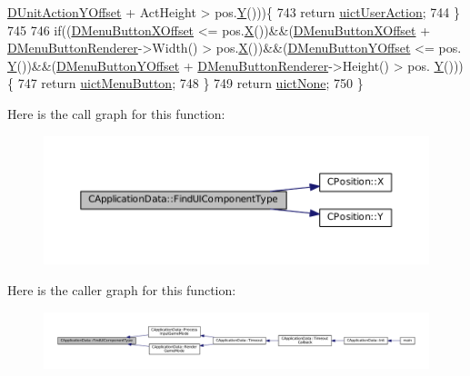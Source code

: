 \begin{DoxyCode}
      \hyperlink{classCApplicationData_a8ccfb55bd25cba0e6eb66573ba9c8b3c}{DUnitActionYOffset} + ActHeight > pos.\hyperlink{classCPosition_a1aa8a30e2f08dda1f797736ba8c13a87}{Y}()))\{
743         \textcolor{keywordflow}{return} \hyperlink{classCApplicationData_ad49585591fc53bff1c89bc512170280da9b2752db122b319f942c3b69c2accfab}{uictUserAction};
744     \}
745     
746     \textcolor{keywordflow}{if}((\hyperlink{classCApplicationData_a04283b17a8c04af8325de4304a848095}{DMenuButtonXOffset} <= pos.\hyperlink{classCPosition_a9a6b94d3b91df1492d166d9964c865fc}{X}())&&(\hyperlink{classCApplicationData_a04283b17a8c04af8325de4304a848095}{DMenuButtonXOffset} + 
      \hyperlink{classCApplicationData_a2c9f10aa452454a016e0164f6ce777a6}{DMenuButtonRenderer}->Width() > pos.\hyperlink{classCPosition_a9a6b94d3b91df1492d166d9964c865fc}{X}())&&(\hyperlink{classCApplicationData_a63012360d0a98eef89707a503f4379a8}{DMenuButtonYOffset} <= pos.
      \hyperlink{classCPosition_a1aa8a30e2f08dda1f797736ba8c13a87}{Y}())&&(\hyperlink{classCApplicationData_a63012360d0a98eef89707a503f4379a8}{DMenuButtonYOffset} + \hyperlink{classCApplicationData_a2c9f10aa452454a016e0164f6ce777a6}{DMenuButtonRenderer}->Height() > pos.
      \hyperlink{classCPosition_a1aa8a30e2f08dda1f797736ba8c13a87}{Y}()))\{
747         \textcolor{keywordflow}{return} \hyperlink{classCApplicationData_ad49585591fc53bff1c89bc512170280da8323c73a1745d4b4e6e469088041f264}{uictMenuButton};
748     \}
749     \textcolor{keywordflow}{return} \hyperlink{classCApplicationData_ad49585591fc53bff1c89bc512170280da21bc83c610f1f8b1d686aed22d343f93}{uictNone};
750 \}
\end{DoxyCode}
Here is the call graph for this function\+:\nopagebreak
\begin{figure}[H]
\begin{center}
\leavevmode
\includegraphics[width=350pt]{classCApplicationData_a1fb2747750babd9b82f51ce206ee6755_cgraph}
\end{center}
\end{figure}
Here is the caller graph for this function\+:\nopagebreak
\begin{figure}[H]
\begin{center}
\leavevmode
\includegraphics[width=350pt]{classCApplicationData_a1fb2747750babd9b82f51ce206ee6755_icgraph}
\end{center}
\end{figure}
